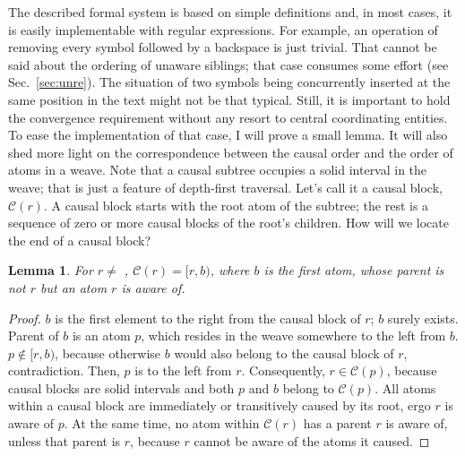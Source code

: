 \documentclass{sig-alternate}
\newtheorem{lemma}{Lemma}
\newcommand{\tighten}{\setlength{\itemsep}{1pt}\setlength{\parskip}{0pt}\setlength{\parsep}{0pt}}
\begin{document}
The described formal system is based on simple definitions and, in most cases, it is easily implementable with regular expressions.
For example, an operation of removing every symbol followed by a backspace is just trivial.
That cannot be said about the ordering of unaware siblings; that case consumes some effort (see Sec.~\ref{sec:unre}).
The situation of two symbols being concurrently inserted at the same position in the text might not be that typical.
Still, it is important to hold the convergence requirement without any resort to central coordinating entities. 
To ease the implementation of that case, I will prove a small lemma.
It will also shed more light on the correspondence between the causal order and the order of atoms in a weave. 
Note that a causal subtree occupies a solid interval in the weave; that is just a feature of depth-first traversal.
Let's call it a causal block, $\mathcal{C}(r)$.
A causal block starts with the root atom of the subtree; the rest is a sequence of zero or more causal blocks of the root's children.
How will we locate the end of a causal block?
\begin{lemma}\tighten For $r \ne$ \aum, $\mathcal{C}(r) = [r,b)$,
where $b$ is the first atom, whose parent is not $r$ but an atom
$r$ is aware of. \label{lemma:1}
\end{lemma} 
\begin{proof}\tighten
$b$ is the first element to the right from the causal
block of $r$; $b$ surely exists. Parent of $b$ is an atom $p$,
which resides in the weave somewhere to the left from $b$.
$p \notin [r,b)$, because otherwise $b$ would also belong
to the causal block of $r$, contradiction.
Then, $p$ is to the left from $r$. 
Consequently, $r \in \mathcal{C}(p)$, because
causal blocks are solid intervals and both $p$ and $b$
belong to $\mathcal{C}(p)$. All atoms within a causal block are
immediately or transitively caused by its root,
ergo $r$ is aware of $p$. At the same time, no atom
within $\mathcal{C}(r)$ has a parent $r$ is aware of, unless
that parent is $r$, because $r$ cannot be aware of the
atoms it caused.
\end{proof}

\end{document}
